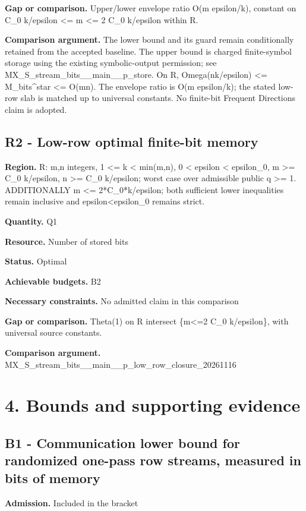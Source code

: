 \documentclass[10pt,a4paper]{article}
\begin{document}
\textbf{Gap or comparison.} Upper/lower envelope ratio O(m epsilon/k), constant on C\_\allowbreak{}0 k/epsilon <= m <= 2 C\_\allowbreak{}0 k/epsilon within R.

\textbf{Comparison argument.} The lower bound and its guard remain conditionally retained from the accepted baseline. The upper bound is charged finite-symbol storage using the existing symbolic-output permission; see MX\_\allowbreak{}S\_\allowbreak{}stream\_\allowbreak{}bits\_\allowbreak{}\_\allowbreak{}main\_\allowbreak{}\_\allowbreak{}p\_\allowbreak{}store. On R, Omega(nk/epsilon) <= M\_\allowbreak{}bits\textasciicircum{}star <= O(mn). The envelope ratio is O(m epsilon/k); the stated low-row slab is matched up to universal constants. No finite-bit Frequent Directions claim is adopted.

\subsection{R2 - Low-row optimal finite-bit memory}
\textbf{Region.} R: m,n integers, 1 <= k < min(m,n), 0 < epsilon < epsilon\_\allowbreak{}0, m >= C\_\allowbreak{}0 k/epsilon, n >= C\_\allowbreak{}0 k/epsilon; worst case over admissible public q >= 1. ADDITIONALLY m <= 2*C\_\allowbreak{}0*k/epsilon; both sufficient lower inequalities remain inclusive and epsilon<epsilon\_\allowbreak{}0 remains strict.

\textbf{Quantity.} Q1

\textbf{Resource.} Number of stored bits

\textbf{Status.} Optimal

\textbf{Achievable budgets.} B2

\textbf{Necessary constraints.} No admitted claim in this comparison

\textbf{Gap or comparison.} Theta(1) on R intersect \{m<=2 C\_\allowbreak{}0 k/epsilon\}, with universal source constants.

\textbf{Comparison argument.} MX\_\allowbreak{}S\_\allowbreak{}stream\_\allowbreak{}bits\_\allowbreak{}\_\allowbreak{}main\_\allowbreak{}\_\allowbreak{}p\_\allowbreak{}low\_\allowbreak{}row\_\allowbreak{}closure\_\allowbreak{}20261116

\section{4. Bounds and supporting evidence}
\subsection{B1 - Communication lower bound for randomized one-pass row streams, measured in bits of memory}
\textbf{Admission.} Included in the bracket
\end{document}
